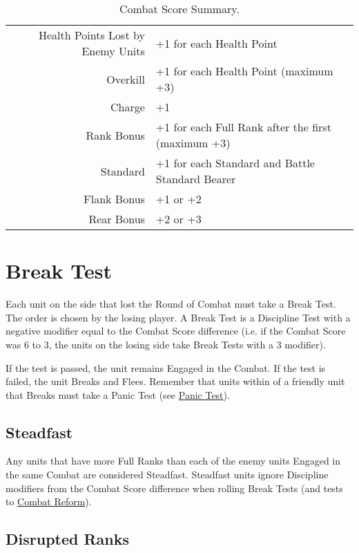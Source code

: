 \begin{table}[H]
\centering
\begin{tabular}{r l }
\toprule
Health Points Lost by Enemy Units & +1 for each Health Point\\
Overkill & +1 for each Health Point (maximum +3)\\
Charge & +1 \\
Rank Bonus & +1 for each Full Rank after the first (maximum +3)\\
Standard & +1 for each Standard and Battle Standard Bearer \\
Flank Bonus & +1 or +2 \\
Rear Bonus & +2 or +3\\
\bottomrule
\end{tabular}
\caption{Combat Score Summary.}
\label{table/combat_score}
\end{table}

\section{Break Test}
\label{break_test}

Each unit on the side that lost the Round of Combat must take a Break Test. The order is chosen by the losing player. A Break Test is a Discipline Test with a negative modifier equal to the Combat Score difference (i.e. if the Combat Score was 6 to 3, the units on the losing side take Break Tests with a \minuss{}3 modifier). 

If the test is passed, the unit remains Engaged in the Combat. If the test is failed, the unit Breaks and Flees. Remember that units within  of a friendly unit that Breaks must take a Panic Test (see \hyperref[panic_test]{Panic Test}).

\subsection{Steadfast}
\label{steadfast}

Any units that have more Full Ranks than each of the enemy units Engaged in the same Combat are considered Steadfast. Steadfast units ignore Discipline modifiers from the Combat Score difference when rolling Break Tests (and tests to \hyperref[combat_reform]{Combat Reform}).

\subsection{Disrupted Ranks}
\label{disrupted_ranks}

